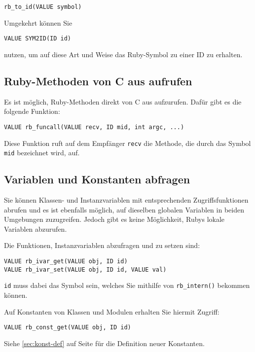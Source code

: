 \begin{lstlisting}
rb_to_id(VALUE symbol)
\end{lstlisting}

Umgekehrt können Sie

\begin{lstlisting}
VALUE SYM2ID(ID id)
\end{lstlisting}

\noindent nutzen, um auf diese Art und Weise das Ruby-Symbol zu einer
ID zu erhalten.

\subsection{Ruby-Methoden von C aus aufrufen}

Es ist möglich, Ruby-Methoden direkt von C aus aufzurufen. Dafür gibt
es die folgende Funktion:

\begin{lstlisting}
VALUE rb_funcall(VALUE recv, ID mid, int argc, ...)
\end{lstlisting}

\noindent Diese Funktion ruft auf dem Empfänger \verb+recv+ die
Methode, die durch das Symbol \verb+mid+ bezeichnet wird,
auf. 

\subsection{Variablen und Konstanten abfragen}

Sie können Klassen- und Instanzvariablen mit entsprechenden
Zugriffsfunktionen abrufen und es ist ebenfalls möglich, auf dieselben
globalen Variablen in beiden Umgebungen zuzugreifen. Jedoch gibt es
keine Möglichkeit, Rubys lokale Variablen abzurufen.

Die Funktionen, Instanzvariablen abzufragen und zu setzen sind:

\begin{lstlisting}
VALUE rb_ivar_get(VALUE obj, ID id)
VALUE rb_ivar_set(VALUE obj, ID id, VALUE val)
\end{lstlisting}

\noindent\verb+id+ muss dabei das Symbol sein, welches Sie mithilfe von \verb+rb_intern()+ bekommen
können. 

Auf Konstanten von Klassen und Modulen erhalten Sie hiermit Zugriff:

\begin{lstlisting}
VALUE rb_const_get(VALUE obj, ID id)
\end{lstlisting}

Siehe \ref{sec:konst-def} auf Seite \pageref{sec:konst-def} für die
Definition neuer Konstanten. 

